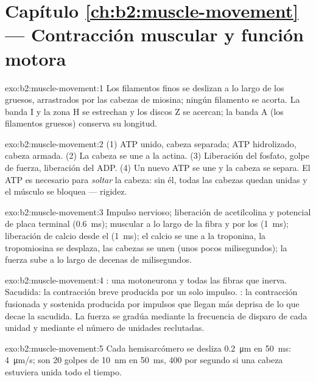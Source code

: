 \section*{Capítulo \ref{ch:b2:muscle-movement} --- Contracción muscular y función motora}

\begin{solution}{exo:b2:muscle-movement:1}
Los filamentos finos se deslizan a lo largo de los gruesos, arrastrados por
las cabezas de miosina; ningún filamento se acorta. La banda I y la zona H
se estrechan y los discos Z se acercan; la banda A (los filamentos gruesos)
conserva su longitud.
\end{solution}

\begin{solution}{exo:b2:muscle-movement:2}
(1) ATP unido, cabeza separada; ATP hidrolizado, cabeza armada. (2) La
cabeza se une a la actina. (3) Liberación del fosfato, golpe de fuerza,
liberación del ADP. (4) Un nuevo ATP se une y la cabeza se separa. El ATP
es necesario para \emph{soltar} la cabeza: sin él, todas las cabezas
quedan unidas y el músculo se bloquea --- rigidez.
\end{solution}

\begin{solution}{exo:b2:muscle-movement:3}
Impulso nervioso; liberación de acetilcolina y potencial de placa terminal
(\qty{0.6}{ms});  muscular a lo largo de la fibra y por
los  (\qty{1}{ms}); liberación de calcio desde el  (\qty{1}{ms}); el calcio se une a la troponina, la
tropomiosina se desplaza, las cabezas se unen (unos pocos milisegundos);
la fuerza sube a lo largo de decenas de milisegundos.
\end{solution}

\begin{solution}{exo:b2:muscle-movement:4}
: una motoneurona y todas las fibras que inerva. Sacudida: la
contracción breve producida por un solo impulso. : la contracción
fusionada y sostenida producida por impulsos que llegan más deprisa de lo
que decae la sacudida. La fuerza se gradúa mediante la frecuencia de
disparo de cada unidad y mediante el número de unidades reclutadas.
\end{solution}

\begin{solution}{exo:b2:muscle-movement:5}
Cada hemisarcómero se desliza \qty{0.2}{\micro m} en \qty{50}{ms}:
\qty{4}{\micro m/s}; son 20 golpes de \qty{10}{nm} en \qty{50}{ms}, 400 por
segundo si una cabeza estuviera unida todo el tiempo.
\end{solution}

